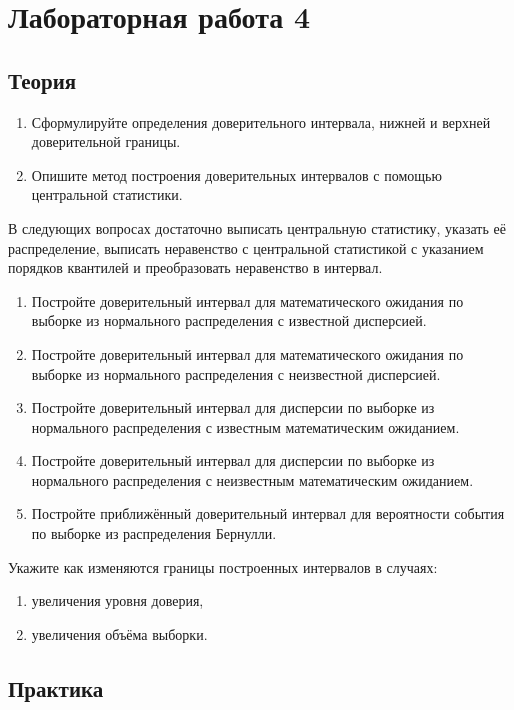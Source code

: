\documentclass[a4paper,12pt]{article}
\begin{document}
\section*{Лабораторная работа 4}

\subsection*{Теория}

\begin{enumerate}
      \item Сформулируйте определения доверительного интервала, нижней и верхней доверительной границы.
      \item Опишите метод построения доверительных интервалов с помощью центральной статистики.
\end{enumerate}
В следующих вопросах достаточно выписать центральную статистику, указать её распределение, выписать неравенство с центральной статистикой с указанием
порядков квантилей и преобразовать неравенство в интервал.
\begin{enumerate}
      \item Постройте доверительный интервал для математического ожидания по выборке из нормального распределения с известной дисперсией.
      \item Постройте доверительный интервал для математического ожидания по выборке из нормального распределения с неизвестной дисперсией.
      \item Постройте доверительный интервал для дисперсии по выборке из нормального распределения с известным математическим ожиданием.
      \item Постройте доверительный интервал для дисперсии по выборке из нормального распределения с неизвестным математическим ожиданием.
      \item Постройте приближённый доверительный интервал для вероятности события по выборке из распределения Бернулли.
\end{enumerate}
Укажите как изменяются границы построенных интервалов в случаях:
\begin{enumerate}
      \item увеличения уровня доверия,
      \item увеличения объёма выборки.
\end{enumerate}

\subsection*{Практика}
\end{document}
